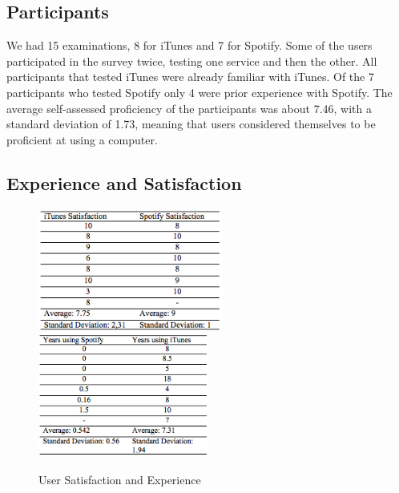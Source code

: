 \documentclass[11pt]{article}
\begin{document}
\subsection{Participants}
We had 15 examinations, 8 for iTunes and 7 for Spotify. Some of the users participated in the survey twice, testing one service and then the other.  All participants that tested iTunes were already familiar with iTunes. Of the 7 participants who tested Spotify only 4 were prior experience with Spotify. The average self-assessed proficiency of the participants was about 7.46, with a standard deviation of 1.73, meaning that users considered themselves to be proficient at using a computer. 


\subsection{Experience and Satisfaction}

\begin{figure}[H] %
   \centering
   \includegraphics[width=2.4in]{satisfaction_.png}       
   \includegraphics[width=2.22in]{times_used.png} 
   \caption{User Satisfaction and Experience}
   \label{fig:satisfaction}
\end{figure}
\end{document}
